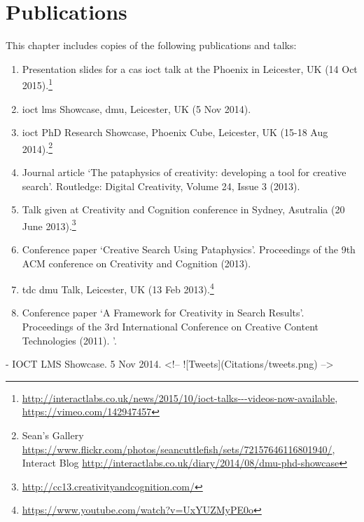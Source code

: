 
\chapter{Publications}
\label{app:pub}

This chapter includes copies of the following publications and talks:


\begin{enumerate}
  \item Presentation slides for a \gls{cas} \gls{ioct} talk at the Phoenix in Leicester, UK (14 Oct 2015).\footnote{\url{http://interactlabs.co.uk/news/2015/10/ioct-talks---videos-now-available}, \url{https://vimeo.com/142947457}}
  \item \gls{ioct} \gls{lms} Showcase, \gls{dmu}, Leicester, UK (5 Nov 2014).
  \item \gls{ioct} PhD Research Showcase, Phoenix Cube, Leicester, UK (15-18 Aug 2014).\footnote{Sean's Gallery \url{https://www.flickr.com/photos/seancuttlefish/sets/72157646116801940/}, Interact Blog \url{http://interactlabs.co.uk/diary/2014/08/dmu-phd-showcase}}
  \item Journal article `The pataphysics of creativity: developing a tool for creative search'. Routledge: Digital Creativity, Volume 24, Issue 3 (2013).
  \item Talk given at Creativity and Cognition conference in Sydney, Asutralia (20 June 2013).\footnote{\url{http://cc13.creativityandcognition.com/}}
  \item Conference paper `Creative Search Using Pataphysics'. Proceedings of the 9th ACM conference on Creativity and Cognition (2013).
  \item \gls{tdc} \gls{dmu} Talk, Leicester, UK (13 Feb 2013).\footnote{\url{https://www.youtube.com/watch?v=UxYUZMyPE0o}}
  \item Conference paper `A Framework for Creativity in Search Results'. Proceedings of the 3rd International Conference on Creative Content Technologies (2011).
'.
\end{enumerate}

\addtocounter{section}{1}



\addtocounter{section}{1}
- IOCT LMS Showcase. 5 Nov 2014.
<!-- ![Tweets](Citations/tweets.png) -->
\newpage


